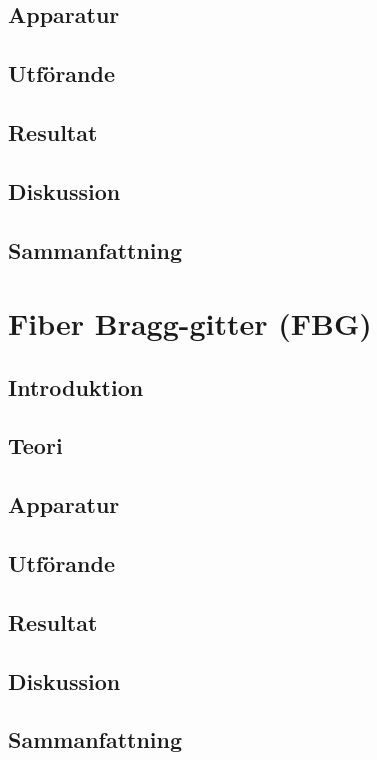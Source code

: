 \documentclass[10pt, a4paper]{article}
\begin{document}
\subsection{Apparatur}
\subsection{Utförande}
\subsection{Resultat}
\subsection{Diskussion}
\subsection{Sammanfattning}

\section{Fiber Bragg-gitter (FBG)}
\subsection{Introduktion}
\subsection{Teori}
\subsection{Apparatur}
\subsection{Utförande}
\subsection{Resultat}
\subsection{Diskussion}
\subsection{Sammanfattning}

\end{document}
